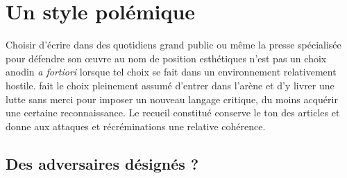 \documentclass[12pt, a4paper]{article}
\begin{document}
    
%       
%       
%       
%       
    
    
    
    

\newpage

\section{Un style polémique}

Choisir d'écrire dans des quotidiens grand public ou même la presse spécialisée pour défendre son œuvre au nom de position esthétiques n'est pas un choix anodin \textit{a fortiori} lorsque tel choix se fait dans un environnement relativement hostile. \robbe{} fait le choix pleinement assumé d'entrer dans l'arène et d'y livrer une lutte sans merci pour imposer un nouveau langage critique, du moins acquérir une certaine reconnaissance. Le recueil constitué conserve le ton des articles et donne aux attaques et récréminations une relative cohérence.

\subsection{Des adversaires désignés ?}
\end{document}
